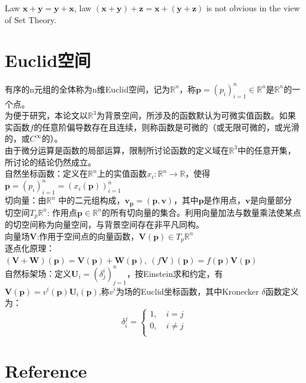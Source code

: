 Law $\boldsymbol{x} + \boldsymbol{y} = \boldsymbol{y} + \boldsymbol{x}$,
law $ (\boldsymbol{x} + \boldsymbol{y} )+ \boldsymbol{z} = \boldsymbol{x} +( \boldsymbol{y} + \boldsymbol{z})$ is not obvious in the view of Set Theory.




\section{Euclid空间}
有序的n元组的全体称为n维Euclid空间，记为$\mathbb R^n$，称$\boldsymbol p=(p_i)_{i=1}^n \in \mathbb R^n$是$\mathbb R^n$的一个点。\\
为便于研究，本论文以$ \mathbb R^3$为背景空间，所涉及的函数默认为可微实值函数。如果实函数$f$的任意阶偏导数存在且连续，则称函数是可微的（或无限可微的，或光滑的，或$C^\infty$的）。\\
由于微分运算是函数的局部运算，限制所讨论函数的定义域在$ \mathbb R^3$中的任意开集，所讨论的结论仍然成立。\\
自然坐标函数：定义在$\mathbb R^n$上的实值函数$x_i: \mathbb R^n \to  \mathbb R$，使得$\boldsymbol p=(p_i)_{i=1}^n = \left( x_i(\boldsymbol p) \right)_{i=1}^n   $\\
切向量：由$\mathbb R^n$ 中的二元组构成，$\boldsymbol v_{\boldsymbol p}=(\boldsymbol p,\boldsymbol v)$，其中$\boldsymbol p$是作用点，$\boldsymbol v$是向量部分\\
切空间$T_p  \mathbb R^n$: 作用点$\boldsymbol p \in \mathbb R^n$的所有切向量的集合。利用向量加法与数量乘法使某点的切空间称为向量空间，与背景空间存在非平凡同构。\\
向量场$\boldsymbol V$:作用于空间点的向量函数，$\boldsymbol V(\boldsymbol p)\in T_p  \mathbb R^n $\\
逐点化原理：$(\boldsymbol V+\boldsymbol W)(\boldsymbol p)=\boldsymbol V(\boldsymbol p)+\boldsymbol W(\boldsymbol p),\ (f \boldsymbol V)(\boldsymbol p)= f(\boldsymbol p)\boldsymbol V (\boldsymbol p)$\\
自然标架场：定义$\boldsymbol U_i=(\delta _j^i)_{j=1}^n$，按Einstein求和约定，有$\boldsymbol V(\boldsymbol p)=v^i(\boldsymbol p)\boldsymbol U_i(\boldsymbol p)$,称$v^i$为场的Euclid坐标函数，其中Kronecker $\delta$函数定义为：
\begin{equation}
\label{Kronecker_delta}
\delta _i^j=\left\{ 
    \begin{aligned}
    1,\  & i =j\\
    0,\  & i \neq j\\
    \end{aligned}
     \right.
\end{equation}

\section{Reference}







